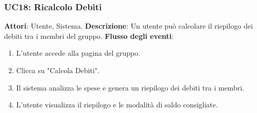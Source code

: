 \subsubsection{UC18: Ricalcolo Debiti}
\textbf{Attori}: Utente, Sistema.
\newline
\newline
\textbf{Descrizione}: Un utente può calcolare il riepilogo dei debiti tra i membri del gruppo.
\newline
\newline
\textbf{Flusso degli eventi}:
\begin{enumerate}
    \item L’utente accede alla pagina del gruppo.
    \item Clicca su "Calcola Debiti".
    \item Il sistema analizza le spese e genera un riepilogo dei debiti tra i membri.
    \item L’utente visualizza il riepilogo e le modalità di saldo consigliate.
\end{enumerate}


